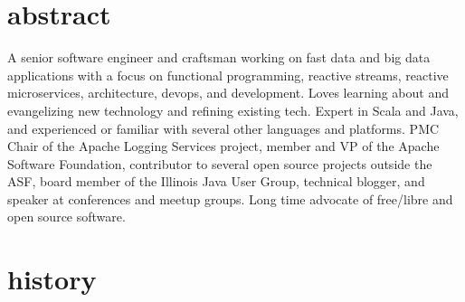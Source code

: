 \documentclass{friggeri-cv}
\begin{document}
\section{abstract}
A senior software engineer and craftsman working on fast data and big data
applications with a focus on functional programming, reactive streams,
reactive microservices, architecture, devops, and development.
Loves learning about and evangelizing new technology and refining existing
tech. Expert in Scala and Java, and experienced or familiar with several
other languages and platforms. PMC Chair of the Apache Logging Services
project, member and VP of the Apache Software Foundation, contributor to several
open source projects outside the ASF, board member of the Illinois Java
User Group, technical blogger, and speaker at conferences and meetup
groups. Long time advocate of free/libre and open source software.

\section{history}
\end{document}
